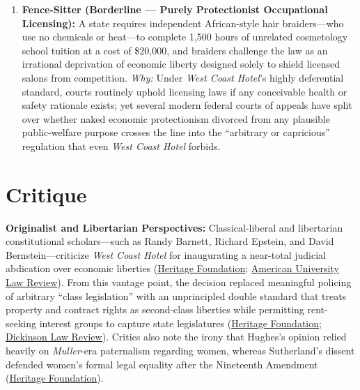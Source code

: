 \documentclass[12pt]{article}
\begin{document}
\begin{enumerate}
\item \textbf{Fence-Sitter (Borderline --- Purely Protectionist Occupational Licensing):} A state requires independent African-style hair braiders---who use no chemicals or heat---to complete 1,500 hours of unrelated cosmetology school tuition at a cost of \$20,000, and braiders challenge the law as an irrational deprivation of economic liberty designed solely to shield licensed salons from competition. \emph{Why:} Under \textit{West Coast Hotel}'s highly deferential standard, courts routinely uphold licensing laws if any conceivable health or safety rationale exists; yet several modern federal courts of appeals have split over whether naked economic protectionism divorced from any plausible public-welfare purpose crosses the line into the ``arbitrary or capricious'' regulation that even \textit{West Coast Hotel} forbids.
\end{enumerate}

\section{Critique}

\textbf{Originalist and Libertarian Perspectives:} Classical-liberal and libertarian constitutional scholars---such as Randy Barnett, Richard Epstein, and David Bernstein---criticize \textit{West Coast Hotel} for inaugurating a near-total judicial abdication over economic liberties (\href{https://www.heritage.org/the-constitution/report/economic-liberty-and-the-constitution-introduction}{Heritage Foundation}; \href{https://digitalcommons.wcl.american.edu/cgi/viewcontent.cgi?article=1061&context=aulr}{American University Law Review}). From this vantage point, the decision replaced meaningful policing of arbitrary ``class legislation'' with an unprincipled double standard that treats property and contract rights as second-class liberties while permitting rent-seeking interest groups to capture state legislatures (\href{https://www.heritage.org/the-constitution/report/economic-liberty-and-the-constitution-introduction}{Heritage Foundation}; \href{https://insight.dickinsonlaw.psu.edu/cgi/viewcontent.cgi?article=1185&context=dlr}{Dickinson Law Review}). Critics also note the irony that Hughes's opinion relied heavily on \textit{Muller}-era paternalism regarding women, whereas Sutherland's dissent defended women's formal legal equality after the Nineteenth Amendment (\href{https://www.heritage.org/the-constitution/report/economic-liberty-and-the-constitution-introduction}{Heritage Foundation}).
\end{document}
